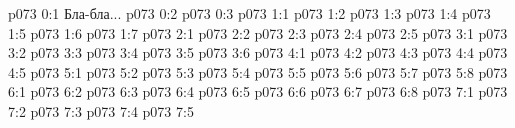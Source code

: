 \author{Солония}
\vs p073 0:1  Бла-бла...
\vs p073 0:2 
\vs p073 0:3 
\vs p073 1:1 
\vs p073 1:2 
\vs p073 1:3 
\vs p073 1:4 
\vs p073 1:5 
\vs p073 1:6 
\vs p073 1:7 
\vs p073 2:1 
\vs p073 2:2 
\vs p073 2:3 
\vs p073 2:4 
\vs p073 2:5 \pc 
{}
\vs p073 3:1 
\vs p073 3:2 
\vs p073 3:3 \pc 
\vs p073 3:4 
\vs p073 3:5 
\vs p073 3:6 
\vs p073 4:1 
\vs p073 4:2 
\vs p073 4:3 
\vs p073 4:4 
\vs p073 4:5 
\vs p073 5:1 
\vs p073 5:2 
\vs p073 5:3 
\vs p073 5:4 
\vs p073 5:5 
\vs p073 5:6 
\vs p073 5:7 
\vs p073 5:8 
\vs p073 6:1 
\vs p073 6:2 
\vs p073 6:3 \pc 
\vs p073 6:4 
\vs p073 6:5 \pc 
\vs p073 6:6 
\vs p073 6:7 \pc 
\vs p073 6:8 
\vs p073 7:1 
\vs p073 7:2 
\vs p073 7:3 \pc 
\vs p073 7:4 
\vsetoff
\vs p073 7:5 
\quizlink
